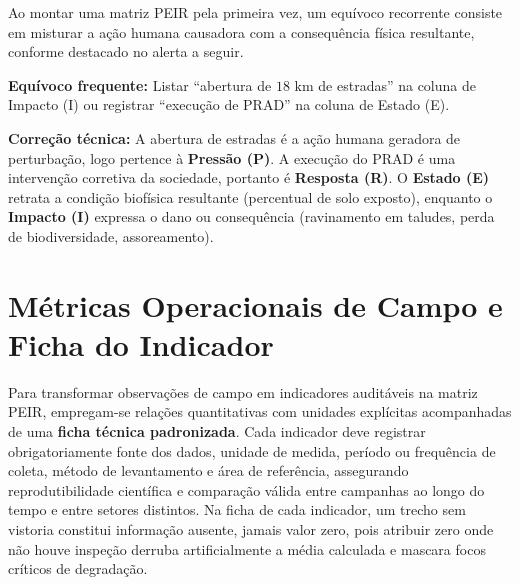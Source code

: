 Ao montar uma matriz PEIR pela primeira vez, um equívoco recorrente consiste em misturar a ação humana causadora com a consequência física resultante, conforme destacado no alerta a seguir.

\begin{boxErro}
\textbf{Equívoco frequente:} Listar ``abertura de $18\text{ km}$ de estradas'' na coluna de Impacto (I) ou registrar ``execução de PRAD'' na coluna de Estado (E).\par
\textbf{Correção técnica:} A abertura de estradas é a ação humana geradora de perturbação, logo pertence à \textbf{Pressão (P)}. A execução do PRAD é uma intervenção corretiva da sociedade, portanto é \textbf{Resposta (R)}. O \textbf{Estado (E)} retrata a condição biofísica resultante (percentual de solo exposto), enquanto o \textbf{Impacto (I)} expressa o dano ou consequência (ravinamento em taludes, perda de biodiversidade, assoreamento).
\end{boxErro}

\section{Métricas Operacionais de Campo e Ficha do Indicador}

Para transformar observações de campo em indicadores auditáveis na matriz PEIR, empregam-se relações quantitativas com unidades explícitas acompanhadas de uma \textbf{ficha técnica padronizada}. Cada indicador deve registrar obrigatoriamente fonte dos dados, unidade de medida, período ou frequência de coleta, método de levantamento e área de referência, assegurando reprodutibilidade científica e comparação válida entre campanhas ao longo do tempo e entre setores distintos. Na ficha de cada indicador, um trecho sem vistoria constitui informação ausente, jamais valor zero, pois atribuir zero onde não houve inspeção derruba artificialmente a média calculada e mascara focos críticos de degradação.

